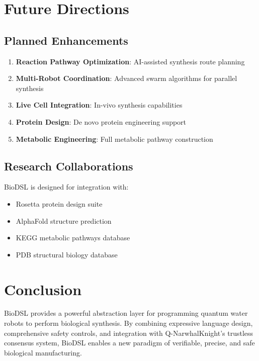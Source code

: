 \documentclass[12pt,a4paper]{article}
\begin{document}
\section{Future Directions}

\subsection{Planned Enhancements}

\begin{enumerate}
    \item \textbf{Reaction Pathway Optimization}: AI-assisted synthesis route planning
    \item \textbf{Multi-Robot Coordination}: Advanced swarm algorithms for parallel synthesis
    \item \textbf{Live Cell Integration}: In-vivo synthesis capabilities
    \item \textbf{Protein Design}: De novo protein engineering support
    \item \textbf{Metabolic Engineering}: Full metabolic pathway construction
\end{enumerate}

\subsection{Research Collaborations}

BioDSL is designed for integration with:

\begin{itemize}
    \item Rosetta protein design suite
    \item AlphaFold structure prediction
    \item KEGG metabolic pathways database
    \item PDB structural biology database
\end{itemize}

\section{Conclusion}

BioDSL provides a powerful abstraction layer for programming quantum water robots to perform biological synthesis. By combining expressive language design, comprehensive safety controls, and integration with Q-NarwhalKnight's trustless consensus system, BioDSL enables a new paradigm of verifiable, precise, and safe biological manufacturing.
\end{document}
